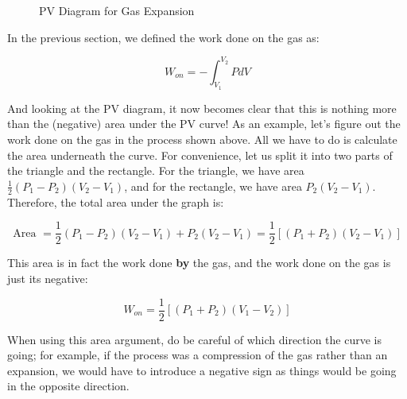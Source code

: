 \documentclass[12pt, a4paper]{article}
\newcounter{exa}
\begin{document}
\begin{figure}[H]
\centering
{}
\caption{PV Diagram for Gas Expansion}
\end{figure}

In the previous section, we defined the work done on the gas as:

\[ W_{on} = -\int_{V_1}^{V_2} PdV \]

And looking at the PV diagram, it now becomes clear that this is nothing more than the (negative) area under the PV curve! As an example, let's figure out the work done on the gas in the process shown above. All we have to do is calculate the area underneath the curve. For convenience, let us split it into two parts of the triangle and the rectangle. For the triangle, we have area $\frac{1}{2}\left(P_1-P_2\right)\left(V_2-V_1\right)$, and for the rectangle, we have area $P_2\left(V_2-V_1\right)$. Therefore, the total area under the graph is:

\[ \text{Area } = \frac{1}{2}\left(P_1-P_2\right)\left(V_2-V_1\right) + P_2\left(V_2-V_1\right) = \frac{1}{2}\left[\left(P_1+P_2\right)\left(V_2-V_1\right) \right]\]

This area is in fact the work done \textbf{by} the gas, and the work done on the gas is just its negative:

\[W_{on} = \frac{1}{2}\left[\left(P_1+P_2\right)\left(V_1-V_2\right) \right]\]

When using this area argument, do be careful of which direction the curve is going; for example, if the process was a compression of the gas rather than an expansion, we would have to introduce a negative sign as things would be going in the opposite direction.
\end{document}
